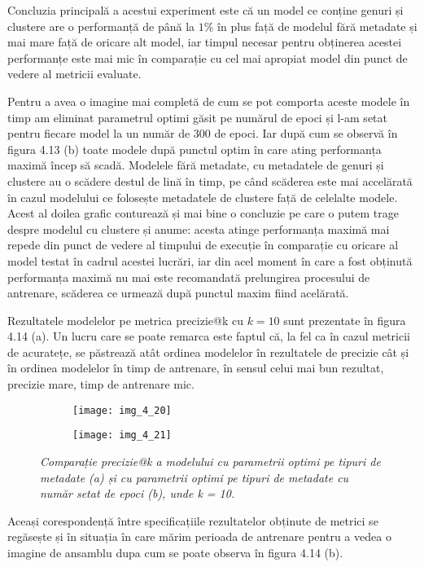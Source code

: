 Concluzia principală a acestui experiment este că un model ce conține genuri și clustere are o performanță de până la $1\%$ în plus față de modelul fără metadate și mai mare față de oricare alt model, iar timpul necesar pentru obținerea acestei performanțe este mai mic în comparație cu cel mai apropiat model din punct de vedere al metricii evaluate.

Pentru a avea o imagine mai completă de cum se pot comporta aceste modele în timp am eliminat parametrul optimi găsit pe numărul de epoci și l-am setat pentru fiecare model la un număr de 300 de epoci. Iar după cum se observă în figura 4.13 (b) toate modele după punctul optim în care ating performanța maximă încep să scadă. Modelele fără metadate, cu metadatele de genuri și clustere au o scădere destul de lină în timp, pe când scăderea este mai accelărată în cazul modelului ce folosește metadatele de clustere față de celelalte modele.
Acest al doilea grafic conturează și mai bine o concluzie pe care o putem trage despre modelul cu clustere și anume: acesta atinge performanța maximă mai repede din punct de vedere al timpului de execuție în comparație cu oricare al model testat în cadrul acestei lucrări, iar din acel moment în care a fost obținută performanța maximă nu mai este recomandată prelungirea procesului de antrenare, scăderea ce urmează după punctul maxim fiind acelărată.

\vspace{5mm}
Rezultatele modelelor pe metrica precizie@k cu $k=10$ sunt prezentate în figura 4.14 (a). Un lucru care se poate remarca este faptul că, la fel ca în cazul metricii de acuratețe, se păstrează atât ordinea modelelor în rezultatele de precizie cât și în ordinea modelelor în timp de antrenare, în sensul celui mai bun rezultat, precizie mare, timp de antrenare mic.
\begin{figure}[!h]
  \begin{subfigure}[b]{0.5\textwidth}
    \texttt{[image: img\_4\_20]}
    \caption{}
    \label{fig:f1}
  \end{subfigure}
  \hfill
  \begin{subfigure}[b]{0.5\textwidth}
    \texttt{[image: img\_4\_21]}
    \caption{}
    \label{fig:f2}
  \end{subfigure}
  \caption[Comparație precizie@k a modelului cu parametrii optimi pe tipuri de metadate]{\textit{Comparație precizie@k a modelului cu parametrii optimi pe tipuri de metadate (a) și cu parametrii optimi pe tipuri de metadate cu număr setat de epoci (b), unde k = 10.}}
\end{figure}
Aceași corespondență între specificațiile rezultatelor obținute de metrici se regăsește și în situația în care mărim perioada de antrenare pentru a vedea o imagine de ansamblu dupa cum se poate observa în figura 4.14 (b).

